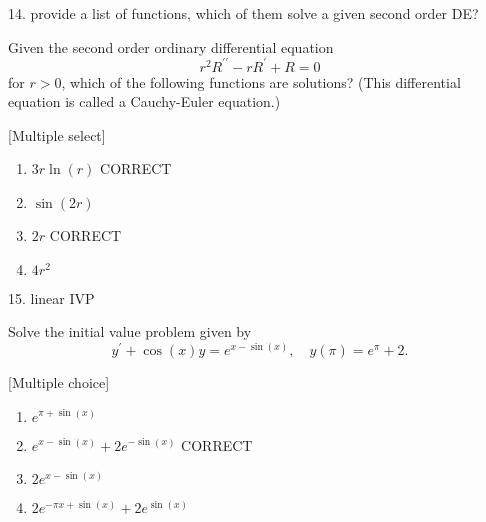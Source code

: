 \documentclass[11pt]{article}
\begin{document}
14. provide a list of functions, which of them solve a given second order DE?

Given the second order ordinary differential equation
\[r^2R^{\prime\prime} - rR^{\prime} + R = 0 \]
for $r>0$, which of the following functions are solutions? (This differential equation is called a Cauchy-Euler equation.)

[Multiple select]
\begin{enumerate}
    \item $3r\ln(r)$ CORRECT
    \item $\sin(2r)$
    \item $2r$ CORRECT
    \item $4r^2$
\end{enumerate}

15. linear IVP

Solve the initial value problem given by
\[y^{\prime} + \cos(x)y = e^{x-\sin(x)}, \quad y(\pi) = e^{\pi}+2.\]

[Multiple choice]
\begin{enumerate}
    \item $e^{\pi+\sin(x)}$
    \item $e^{x-\sin(x)} + 2e^{-\sin(x)}$ CORRECT
    \item $2e^{x-\sin(x)}$
    \item $2e^{-\pi x + \sin(x)} + 2e^{\sin(x)}$
\end{enumerate}
\end{document}
